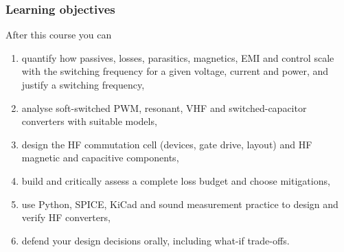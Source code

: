 \begin{frame}
	\frametitle{Learning objectives}
	After this course you can
	\begin{enumerate}
		\item quantify how passives, losses, parasitics, magnetics, EMI and control scale with the switching frequency for a given voltage, current and power, and justify a switching frequency,
		\item analyse soft-switched PWM, resonant, VHF and switched-capacitor converters with suitable models,
		\item design the HF commutation cell (devices, gate drive, layout) and HF magnetic and capacitive components,
		\item build and critically assess a complete loss budget and choose mitigations,
		\item use Python, SPICE, KiCad and sound measurement practice to design and verify HF converters,
		\item defend your design decisions orally, including what-if trade-offs.
	\end{enumerate}
\end{frame}

